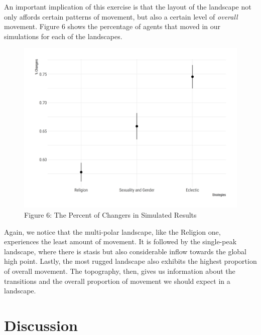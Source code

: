 \documentclass[
  11pt,
]{article}
\begin{document}
An important implication of this exercise is that the layout of the
landscape not only affords certain patterns of movement, but also a
certain level of \emph{overall} movement. Figure 6 shows the percentage
of agents that moved in our simulations for each of the landscapes.

\begin{figure}[htp]
\begin{center}
\caption*{Figure 6: The Percent of Changers in Simulated Results}

\begin{center}\includegraphics[width=1\linewidth]{../figures/figure_6} \end{center}

\end{center}
\end{figure}

Again, we notice that the multi-polar landscape, like the Religion one,
experiences the least amount of movement. It is followed by the
single-peak landscape, where there is stasis but also considerable
inflow towards the global high point. Lastly, the most rugged landscape
also exhibits the highest proportion of overall movement. The
topography, then, gives us information about the transitions and the
overall proportion of movement we should expect in a landscape.

\hypertarget{discussion}{%
\section{Discussion}\label{discussion}}
\end{document}
